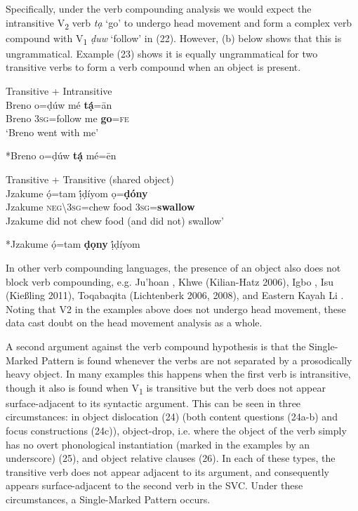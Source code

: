 \documentclass[output=paper]{langsci/langscibook}
\begin{document}
Specifically, under the verb compounding analysis we would expect the intransitive V\textsubscript{2} verb \textit{tạ }‘go’ to undergo head movement and form a complex verb compound with V\textsubscript{1} \textit{ḍuw} ‘follow’ in (22). However, (b) below shows that this is ungrammatical. Example (23) shows it is equally ungrammatical for two transitive verbs to form a verb compound when an object is present. 

\ea
{Transitive + Intransitive}\\
\gll   Breno   o=ḍúw    mé   \textbf{tạ́}=\={a}n\\
     Breno   3\textsc{sg}=follow   me   \textbf{go}=\textsc{fe}\\
\glt ‘Breno went with me’ \citep[115]{Kari2004}
\z




\ea
  *Breno o=ḍúw  \textbf{tạ́}  mé=\={e}n\\
\z

\ea
{Transitive + Transitive (shared object)}\\
\gll   Jzakume   ọ́=tam      ị́ḍíyom  ọ=\textbf{ḍóny}\\
     Jzakume  \textsc{neg{\textbackslash}}3\textsc{sg}=chew  food  3\textsc{sg}=\textbf{swallow}\\
\glt Jzakume did not chew food (and did not) swallow’ \citep[110]{Kari2004}
\z




\ea
   *Jzakume  ọ́=tam  \textbf{ḍọny  }ị́ḍíyom\\
\z


In other verb compounding languages, the presence of an object also does not block verb compounding, e.g. Ju{\textbar}’hoan \citep{Collins2002}, Khwe (Kilian-Hatz 2006), Igbo \citep{Lord1975}, Isu (Kießling 2011), Toqabaqita (Lichtenberk 2006, 2008), and Eastern Kayah Li \citep{Solnit2006}. Noting that V2 in the examples above does not undergo head movement, these data cast doubt on the head movement analysis as a whole.

A second argument against the verb compound hypothesis is that the Single-Marked Pattern is found whenever the verbs are not separated by a prosodically heavy object. In many examples this happens when the first verb is intransitive, though it also is found when V\textsubscript{1} is transitive but the verb does not appear surface-adjacent to its syntactic argument. This can be seen in three circumstances: in object dislocation (24) (both content questions (24a-b) and focus constructions (24c)), object-drop, i.e. where the object of the verb simply has no overt phonological instantiation (marked in the examples by an underscore) (25), and object relative clauses (26). In each of these types, the transitive verb does not appear adjacent to its argument, and consequently appears surface-adjacent to the second verb in the SVC. Under these circumstances, a Single-Marked Pattern occurs.
\end{document}
